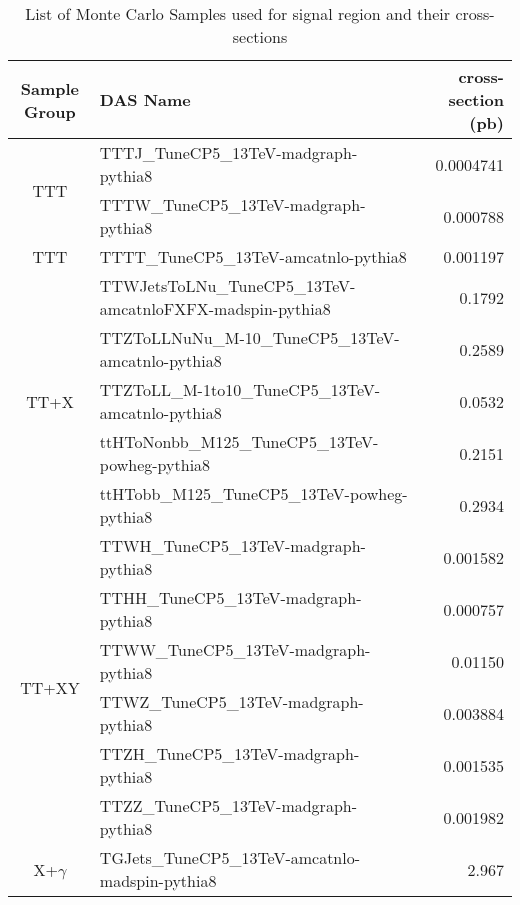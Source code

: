 \begin{table}
  \centering
  \caption{List of Monte Carlo Samples used for signal region and their cross-sections}\label{tab:signal_xsec}
  \begin{tabular}{ c l r }
    \hline
    Sample Group           & DAS Name                                                  & cross-section (pb) \\
    \hline
    \multirow{2}{*}{TTT}   & TTTJ\_TuneCP5\_13TeV-madgraph-pythia8                     & 0.0004741          \\
                           & TTTW\_TuneCP5\_13TeV-madgraph-pythia8                     & 0.000788           \\
    \hline
    \multirow{1}{*}{TTT}   & TTTT\_TuneCP5\_13TeV-amcatnlo-pythia8                     & 0.001197           \\
    \hline
    \multirow{5}{*}{TT+X}  & TTWJetsToLNu\_TuneCP5\_13TeV-amcatnloFXFX-madspin-pythia8 & 0.1792             \\
                           & TTZToLLNuNu\_M-10\_TuneCP5\_13TeV-amcatnlo-pythia8        & 0.2589             \\
                           & TTZToLL\_M-1to10\_TuneCP5\_13TeV-amcatnlo-pythia8         & 0.0532             \\
                           & ttHToNonbb\_M125\_TuneCP5\_13TeV-powheg-pythia8           & 0.2151             \\
                           & ttHTobb\_M125\_TuneCP5\_13TeV-powheg-pythia8              & 0.2934             \\
    \hline
    \multirow{6}{*}{TT+XY} & TTWH\_TuneCP5\_13TeV-madgraph-pythia8                     & 0.001582           \\
                           & TTHH\_TuneCP5\_13TeV-madgraph-pythia8                     & 0.000757           \\
                           & TTWW\_TuneCP5\_13TeV-madgraph-pythia8                     & 0.01150            \\
                           & TTWZ\_TuneCP5\_13TeV-madgraph-pythia8                     & 0.003884           \\
                           & TTZH\_TuneCP5\_13TeV-madgraph-pythia8                     & 0.001535           \\
                           & TTZZ\_TuneCP5\_13TeV-madgraph-pythia8                     & 0.001982           \\
    \hline
    \multirow{6}{*}{X+$\gamma$} & TGJets\_TuneCP5\_13TeV-amcatnlo-madspin-pythia8           & 2.967              \\

\end{tabular}
\end{table}
